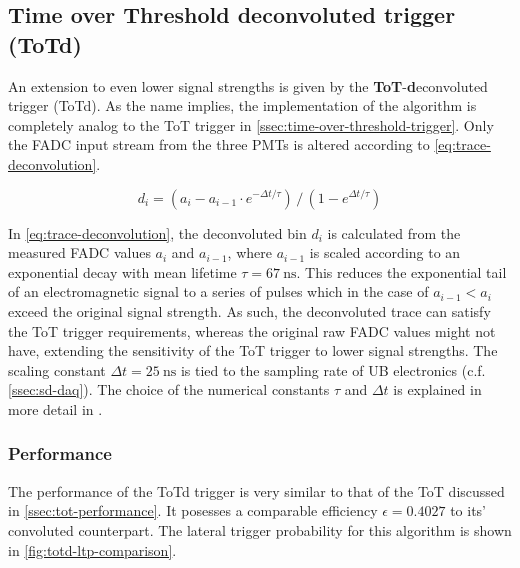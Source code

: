 \subsection{Time over Threshold deconvoluted trigger (ToTd)}
\label{ssec:time-over-threshold-deconvoluted}

An extension to even lower signal strengths is given by the \textbf{ToT}-\textbf{d}econvoluted trigger (ToTd). As the name implies, the implementation of the 
algorithm is completely analog to the ToT trigger in \autoref{ssec:time-over-threshold-trigger}. Only the FADC input stream from the three PMTs is altered 
according to \autoref{eq:trace-deconvolution}.

\begin{equation}
    \label{eq:trace-deconvolution}
    d_i = (a_i - a_{i-1}\cdot e^{-\Delta t/\tau})\,/\,(1 - e^{\Delta t/\tau}) 
\end{equation}

In \autoref{eq:trace-deconvolution}, the deconvoluted bin $d_i$ is calculated from the measured FADC values $a_i$ and $a_{i-1}$, where $a_{i-1}$ is scaled 
according to an exponential decay with mean lifetime $\tau = \SI{67}{\nano\second}$. This reduces the exponential tail of an electromagnetic signal to a 
series of pulses which in the case of $a_{i-1} < a_i$ exceed the original signal strength. As such, the deconvoluted trace can satisfy the ToT trigger 
requirements, whereas the original raw FADC values might not have, extending the sensitivity of the ToT trigger to lower signal strengths. The scaling constant 
$\Delta t = \SI{25}{\nano\second}$ is tied to the sampling rate of UB electronics (c.f. \autoref{ssec:sd-daq}). The choice of the numerical constants $\tau$ and 
$\Delta t$ is explained in more detail in \cite{ToTtriggerIdea}.

\subsubsection{Performance}
\label{ssec:totd-performance}

The performance of the ToTd trigger is very similar to that of the ToT discussed in \autoref{ssec:tot-performance}. It posesses a comparable efficiency
$\epsilon = 0.4027$ to its' convoluted counterpart. The lateral trigger probability for this algorithm is shown in \autoref{fig:totd-ltp-comparison}.

